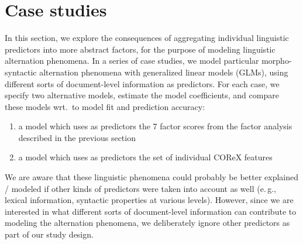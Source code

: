 \section{Case studies}
\label{sec:case-studies}
In this section, we explore the consequences of aggregating individual linguistic predictors into more abstract factors, for the purpose of modeling linguistic alternation phenomena.
In a series of case studies, we model particular morpho-syntactic alternation phenomena with generalized linear models (GLMs), using different sorts of document-level information as predictors. For each case, we specify two alternative models, estimate the model coefficients, and compare these models wrt.\ to model fit and prediction accuracy:

\begin{enumerate}
  \item a model which uses as predictors the 7 factor scores from the factor analysis described in the previous section
  \item a model which uses as predictors the set of individual COReX features
\end{enumerate}

We are aware that these linguistic phenomena could probably be better explained / modeled if other kinds of predictors were taken into account as well (e.\,g., lexical information, syntactic properties at various levels).
However, since we are interested in what different sorts of document-level information can contribute to modeling the alternation phenomena, we deliberately ignore other predictors as part of our study design.

